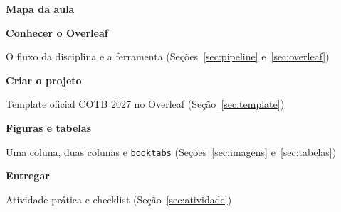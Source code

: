     \vspace{0.4em}

    {\large\bfseries\color{azul}\faMap[regular]\hspace{0.5em}Mapa da aula}\par\vspace{0.2em}
    \begin{tcbraster}[raster columns=2, raster equal height, raster column skip=8pt, raster row skip=6pt]
        \begin{tcolorbox}[cartao, colback=azulMedio!5, colframe=azulMedio!25]
            \hspace{0.4em}\textbf{Conhecer o Overleaf}\par\vspace{2pt}
            {\color{suave}\footnotesize O fluxo da disciplina e a ferramenta (Seções~\ref{sec:pipeline} e~\ref{sec:overleaf})}
        \end{tcolorbox}
        \begin{tcolorbox}[cartao, colback=verdeVivo!5, colframe=verdeVivo!25]
            \hspace{0.4em}\textbf{Criar o projeto}\par\vspace{2pt}
            {\color{suave}\footnotesize Template oficial COTB 2027 no Overleaf (Seção~\ref{sec:template})}
        \end{tcolorbox}
        \begin{tcolorbox}[cartao, colback=ambar!6, colframe=ambar!30]
            \hspace{0.4em}\textbf{Figuras e tabelas}\par\vspace{2pt}
            {\color{suave}\footnotesize Uma coluna, duas colunas e \texttt{booktabs} (Seções~\ref{sec:imagens} e~\ref{sec:tabelas})}
        \end{tcolorbox}
        \begin{tcolorbox}[cartao, colback=roxo!5, colframe=roxo!25]
            \hspace{0.4em}\textbf{Entregar}\par\vspace{2pt}
            {\color{suave}\footnotesize Atividade prática e checklist (Seção~\ref{sec:atividade})}
        \end{tcolorbox}
    \end{tcbraster}

